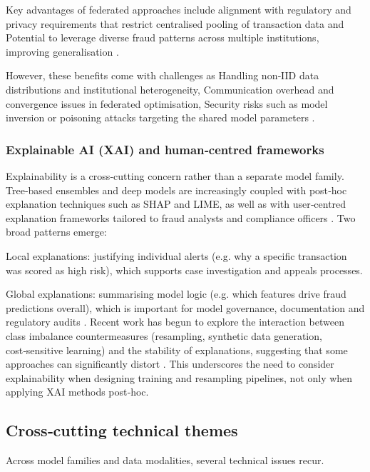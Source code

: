 \documentclass[a4paper,fleqn]{cas-dc}
\begin{document}
Key advantages of federated approaches include alignment with regulatory and privacy requirements that restrict centralised pooling of transaction data and Potential to leverage diverse fraud patterns across multiple institutions, improving generalisation \cite{awosika_transparency_2024}.

However, these benefits come with challenges as Handling non‑IID data distributions and institutional heterogeneity, Communication overhead and convergence issues in federated optimisation, Security risks such as model inversion or poisoning attacks targeting the shared model parameters \cite{baabdullah_efficiency_2024, ahmed_secure_2024, dang_comprehensive_2024}.

\subsubsection{Explainable AI (XAI) and human‑centred frameworks}
Explainability is a cross‑cutting concern rather than a separate model family. 
Tree‑based ensembles and deep models are increasingly coupled with post‑hoc explanation techniques such as SHAP and LIME, as well as with user‑centred explanation frameworks tailored to fraud analysts and compliance officers \cite{damanik_advanced_2025, ghosh_novel_2025, talaat_precise_2025}.
Two broad patterns emerge:

Local explanations: justifying individual alerts (e.g. why a specific transaction was scored as high risk), which supports case investigation and appeals processes.

Global explanations: summarising model logic (e.g. which features drive fraud predictions overall), which is important for model governance, documentation and regulatory audits \cite{cerneviciene_explainable_2024, iqbal_efficient_2025}.
Recent work has begun to explore the interaction between class imbalance countermeasures (resampling, synthetic data generation, cost‑sensitive learning) and the stability of explanations, suggesting that some approaches can significantly distort \cite{damanik_advanced_2025}. 
This underscores the need to consider explainability when designing training and resampling pipelines, not only when applying XAI methods post‑hoc.

\subsection{Cross‑cutting technical themes}
Across model families and data modalities, several technical issues recur.
\end{document}

